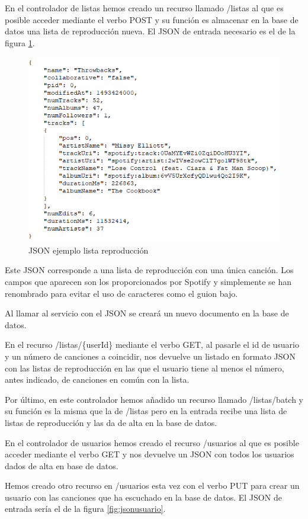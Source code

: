 \documentclass[12pt]{report} %
\begin{document}
En el controlador de listas hemos creado un recurso llamado /listas al que es posible acceder mediante el verbo POST y su función es almacenar en la base de datos una lista de reproducción nueva. El JSON de entrada necesario es el de la figura \ref{fig:jsonlista}.

\begin{figure}
	\centering
	\includegraphics[width=0.7\linewidth]{imagenes/jsonLista}
	\caption{JSON ejemplo lista reproducción}
	\label{fig:jsonlista}
\end{figure}


Este JSON corresponde a una lista de reproducción con una única canción. Los campos que aparecen son los proporcionados por Spotify y simplemente se han renombrado para evitar el uso de caracteres como el guion bajo.

Al llamar al servicio con el JSON se creará un nuevo documento en la base de datos.

En el recurso /listas/\{userId\} mediante el verbo GET, al pasarle el id de usuario y un número de canciones a coincidir, nos devuelve un listado en formato JSON con las listas de reproducción en las que el usuario tiene al menos el número, antes indicado, de canciones en común con la lista.

Por último, en este controlador hemos añadido un recurso llamado /listas/batch y su función es la misma que la de /listas pero en la entrada recibe una lista de listas de reproducción y las da de alta en la base de datos.


En el controlador de usuarios hemos creado el recurso /usuarios al que es posible acceder mediante el verbo GET y nos devuelve un JSON con todos los usuarios dados de alta en base de datos.

Hemos creado otro recurso en /usuarios esta vez con el verbo PUT para crear un usuario con las canciones que ha escuchado en la base de datos. El JSON de entrada sería el de la figura \ref{fig:jsonusuario}.
\end{document}
